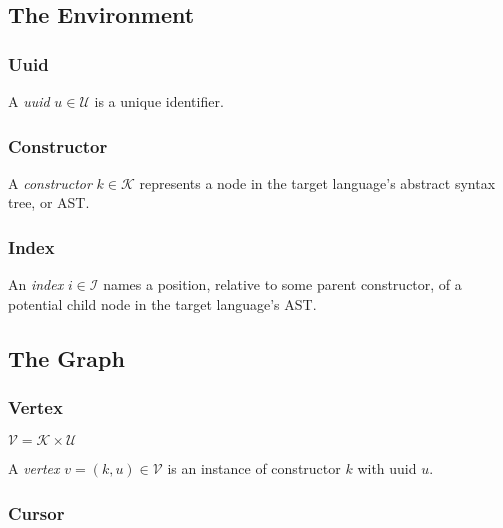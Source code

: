 \documentclass[letterpaper,12pt]{article}
\def\I{\mathcal{I}}
\def\K{\mathcal{K}}
\def\U{\mathcal{U}}
\def\V{\mathcal{V}}
\begin{document}
\subsection{The Environment}
\label{sec:the-environment}

\subsubsection{Uuid}
\label{sec:uuid}

A \emph{uuid} $u \in \U$ is a unique identifier.


\subsubsection{Constructor}
\label{sec:constructor}

A \emph{constructor} $k \in \K$ represents a node in the target language's
abstract syntax tree, or AST.

\subsubsection{Index}
\label{sec:index}

An \emph{index} $i \in \I$ names a position, relative to some parent
constructor, of a potential child node in the target language's AST.


\subsection{The Graph}
\label{sec:the-graph}


\subsubsection{Vertex}
\label{sec:vertex}

$\V = \K \times \U$

A \emph{vertex} $v = (k, u) \in \V$ is an instance of constructor $k$ with
uuid $u$.


\subsubsection{Cursor}
\label{sec:cursor}
\end{document}
